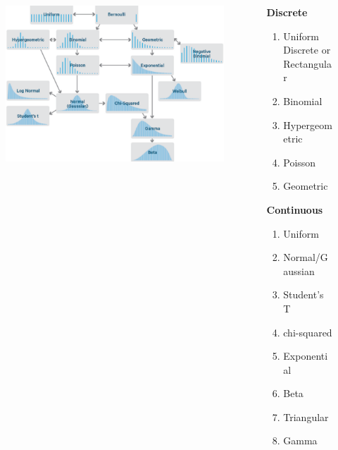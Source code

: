 \documentclass{beamer}
\begin{document}
\begin{frame}
\begin{columns}
\begin{column}{0.69\paperwidth}
	\begin{figure}
		\includegraphics[scale=.4]{Distributions}
	\end{figure}
\end{column}
\begin{column}{0.3\paperwidth}
	\textbf{Discrete}
	\begin{enumerate}
		\item Uniform Discrete or Rectangular
		\setlength{\itemsep}{0.mm}
		\item Binomial
		\setlength{\itemsep}{0.mm}
		\item Hypergeometric
		\setlength{\itemsep}{0.mm}
		\item Poisson
		\setlength{\itemsep}{0.mm}
		\item Geometric
	\end{enumerate}
	\textbf{Continuous}
	\begin{enumerate}
		\item Uniform 
		\setlength{\itemsep}{0.mm}
		\item Normal/Gaussian
		\setlength{\itemsep}{0.mm}
		\item Student’s T
		\setlength{\itemsep}{0.mm}
		\item chi-squared
		\item Exponential
		\setlength{\itemsep}{0.mm}
		\item Beta
		\setlength{\itemsep}{0.mm}
		\item Triangular
		\setlength{\itemsep}{0.mm}
		\item Gamma
		
	\end{enumerate}
	
\end{column}
\end{columns}

\end{frame}
\end{document}
